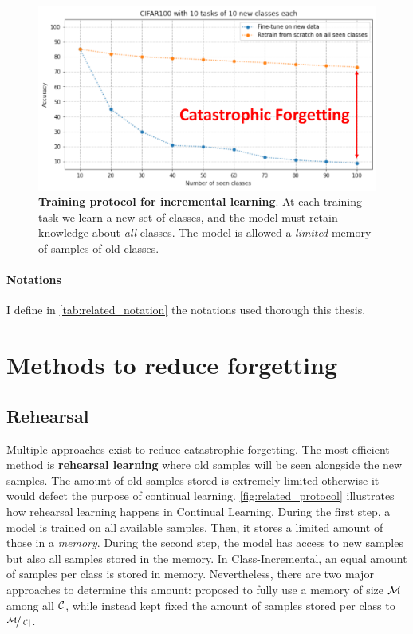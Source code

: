 \begin{figure}[tb]
    \begin{center}
        \includegraphics[width=0.8\linewidth]{images/related/catastrophic_forgetting.pdf}
    \end{center}
    \caption{\textbf{Training protocol for incremental learning}. At each training task we learn a
        new set of classes, and the model must retain knowledge about \textit{all} classes. The
        model is allowed a \textit{limited} memory of samples of old classes.}
    \label{fig:related_forgetting}
\end{figure}

\paragraph{Notations} I define in \autoref{tab:related_notation} the notations used thorough this thesis.



\section{Methods to reduce forgetting}
\label{sec:related_methods}

\subsection{Rehearsal}
\label{sec:related_rehearsal}

Multiple approaches exist to reduce catastrophic forgetting. The most efficient method is
\textbf{rehearsal learning} where old samples will be seen alongside the new samples. The amount of
old samples stored is extremely limited otherwise it would defect the purpose of continual learning.
\autoref{fig:related_protocol} illustrates how rehearsal learning happens in Continual Learning.
During the first step, a model is trained on all available samples. Then, it stores a limited amount
of those in a \textit{memory}. During the second step, the model has access to new samples but also
all samples stored in the memory. In Class-Incremental, an equal amount of samples per class is
stored in memory. Nevertheless, there are two major approaches to determine this amount:
\cite{rebuffi2017icarl} proposed to fully use a memory of size $\mathcal{M}$ among all $\mathcal{C}$, while
\cite{hou2019ucir} instead kept fixed the amount of samples stored per class to $\nicefrac{\mathcal{M}}{|\mathcal{C}|}$.

